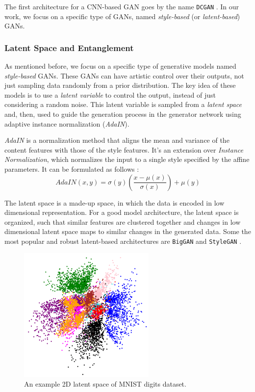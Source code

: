 The first architecture for a CNN-based GAN goes by the name \texttt{DCGAN} \cite{radford2016unsupervised}. In our work, we focus on a specific type of GANs, named \emph{style-based} (or \emph{latent-based}) GANs.

\subsubsection{Latent Space and Entanglement}
As mentioned before, we focus on a specific type of generative models named \emph{style-based} GANs. These GANs can have artistic control over their outputs, not just sampling data randomly from a prior distribution. The key idea of these models is to use a \emph{latent variable} to control the output, instead of just considering a random noise. This latent variable is sampled from a \emph{latent space} and, then, used to guide the generation process in the generator network using adaptive instance normalization (\emph{AdaIN}).

\emph{AdaIN} is a normalization method that aligns the mean and variance of the content features with those of the style features. It's an extension over \emph{Instance Normalization}, which normalizes the input to a single style specified by the affine parameters. It can be formulated as follows :
\begin{equation}
    AdaIN(x,y) = \sigma(y)(\frac{x - \mu(x)}{\sigma(x)}) + \mu(y)
\end{equation}

The latent space is a made-up space, in which the data is encoded in low dimensional representation. For a good model architecture, the latent space is organized, such that similar features are clustered together and changes in low dimensional latent space maps to similar changes in the generated data. Some the most popular and robust latent-based architectures are \texttt{BigGAN} \cite{brock2019large} and \texttt{StyleGAN} \cite{karras2019stylebased} \cite{karras2020analyzing}. 

\begin{figure}[H]
    \centering
    \includegraphics[width=0.6\textwidth]{images/latent-space.png}
    \caption{An example 2D latent space of MNIST digits dataset.}
    \label{fig:lspace}
\end{figure}

